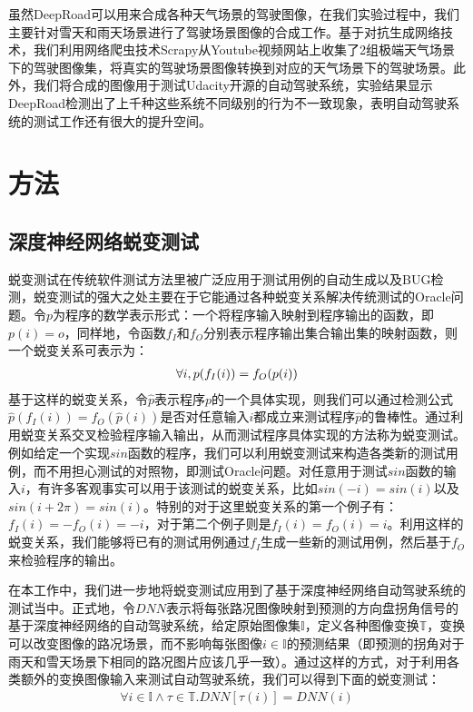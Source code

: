 虽然DeepRoad可以用来合成各种天气场景的驾驶图像，在我们实验过程中，我们主要针对雪天和雨天场景进行了驾驶场景图像的合成工作。基于对抗生成网络技术，我们利用网络爬虫技术Scrapy从Youtube视频网站上收集了2组极端天气场景下的驾驶图像集，将真实的驾驶场景图像转换到对应的天气场景下的驾驶场景。此外，我们将合成的图像用于测试Udacity开源的自动驾驶系统\cite{udacity_as}，实验结果显示DeepRoad检测出了上千种这些系统不同级别的行为不一致现象，表明自动驾驶系统的测试工作还有很大的提升空间。

\section{方法}

\subsection{深度神经网络蜕变测试}

蜕变测试在传统软件测试方法里被广泛应用于测试用例的自动生成以及BUG检测，蜕变测试的强大之处主要在于它能通过各种蜕变关系解决传统测试的Oracle问题。令$p$为程序的数学表示形式：一个将程序输入映射到程序输出的函数，即$p(i) = o$，同样地，令函数$f_I$和$f_O$分别表示程序输出集合输出集的映射函数，则一个蜕变关系可表示为：
\begin{gather}
    \centering
    \forall i, p(f_I(i))=f_O(p(i))
    \label{f:mt}
\end{gather}
基于这样的蜕变关系，令$\hat{p}$表示程序$p$的一个具体实现，则我们可以通过检测公式$\hat{p}(f_I(i))=f_O(\hat{p}(i))$是否对任意输入$i$都成立来测试程序$\hat{p}$的鲁棒性。通过利用蜕变关系交叉检验程序输入输出，从而测试程序具体实现的方法称为蜕变测试。例如给定一个实现$sin$函数的程序，我们可以利用蜕变测试来构造各类新的测试用例，而不用担心测试的对照物，即测试Oracle问题。对任意用于测试$sin$函数的输入$i$，有许多客观事实可以用于该测试的蜕变关系，比如$sin(-i)=sin(i)$以及$sin(i+2\pi)=sin(i)$。特别的对于这里蜕变关系的第一个例子有：$f_I(i)=-f_O(i)=-i$，对于第二个例子则是$f_I(i)=f_O(i)=i$。利用这样的蜕变关系，我们能够将已有的测试用例通过$f_I$生成一些新的测试用例，然后基于$f_O$来检验程序的输出。

在本工作中，我们进一步地将蜕变测试应用到了基于深度神经网络自动驾驶系统的测试当中。正式地，令$DNN$表示将每张路况图像映射到预测的方向盘拐角信号的基于深度神经网络的自动驾驶系统，给定原始图像集$\mathbb{I}$，定义各种图像变换$\mathbb{T}$，变换可以改变图像的路况场景，而不影响每张图像$i\in \mathbb{I}$的预测结果（即预测的拐角对于雨天和雪天场景下相同的路况图片应该几乎一致）。通过这样的方式，对于利用各类额外的变换图像输入来测试自动驾驶系统，我们可以得到下面的蜕变测试：
\begin{gather}
    \forall i \in \mathbb{I} \wedge \tau \in \mathbb{T}. DNN[\tau(i)]=DNN(i)
\end{gather}

